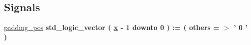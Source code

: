 \subsection*{Signals}
 \begin{DoxyCompactItemize}
\item 
\hypertarget{group___truncation_gac257856843ad01f95857ccecfea5e47e}{\hyperlink{group___truncation_gac257856843ad01f95857ccecfea5e47e}{padding\+\_\+pos} {\bfseries \textcolor{vhdlchar}{std\+\_\+logic\+\_\+vector}\textcolor{vhdlchar}{ }\textcolor{vhdlchar}{(}\textcolor{vhdlchar}{ }\textcolor{vhdlchar}{ }\textcolor{vhdlchar}{ }\textcolor{vhdlchar}{ }{\bfseries \hyperlink{group___truncation_ga63701d8af27da7452a7588efcff357bc}{x}} \textcolor{vhdlchar}{-\/}\textcolor{vhdlchar}{ } \textcolor{vhdldigit}{1} \textcolor{vhdlchar}{ }\textcolor{vhdlchar}{downto}\textcolor{vhdlchar}{ }\textcolor{vhdlchar}{ } \textcolor{vhdldigit}{0} \textcolor{vhdlchar}{ }\textcolor{vhdlchar}{)}\textcolor{vhdlchar}{ }\textcolor{vhdlchar}{ }\textcolor{vhdlchar}{ }\textcolor{vhdlchar}{\+:}\textcolor{vhdlchar}{=}\textcolor{vhdlchar}{ }\textcolor{vhdlchar}{(}\textcolor{vhdlchar}{ }\textcolor{vhdlchar}{ }\textcolor{vhdlchar}{others}\textcolor{vhdlchar}{ }\textcolor{vhdlchar}{ }\textcolor{vhdlchar}{=}\textcolor{vhdlchar}{ }\textcolor{vhdlchar}{$>$}\textcolor{vhdlchar}{ }\textcolor{vhdlchar}{'}\textcolor{vhdlchar}{ } \textcolor{vhdldigit}{0} \textcolor{vhdlchar}{ }\textcolor{vhdlchar}{'}\textcolor{vhdlchar}{ }\textcolor{vhdlchar}{)}\textcolor{vhdlchar}{ }} }\label{group___truncation_gac257856843ad01f95857ccecfea5e47e}


\end{DoxyCompactItemize}
